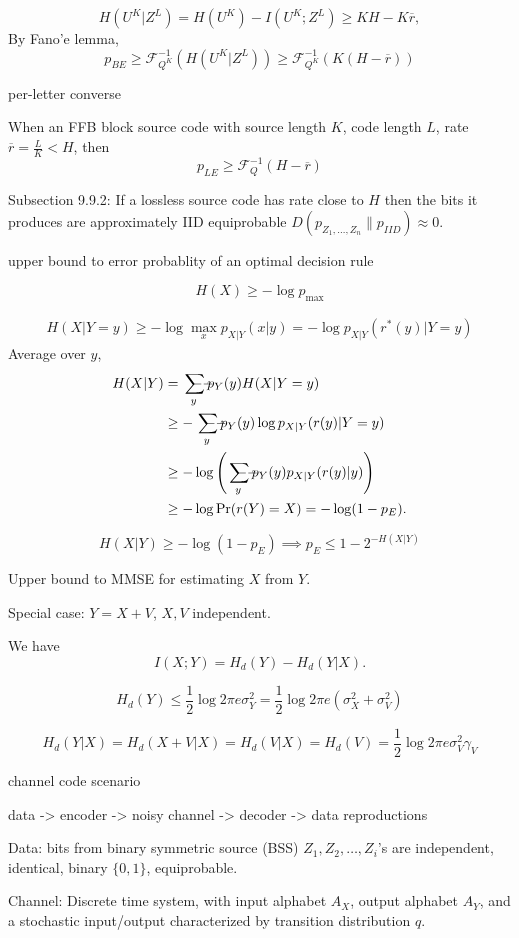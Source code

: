 \documentclass{report}
\def \ssumsym {\mathrlap{\ \ --}\sum}
\DeclareMathOperator*{\ssum}{\ssumsym}
\theoremstyle{definition}
\theoremstyle{remark}
\numberwithin{equation}{section}
\begin{document}
\[
H(U^K|Z^L) = H(U^K) - I(U^K;Z^L) \geq KH - K\overline{r},  
\] By Fano'e lemma, \[p_{BE} \geq \mathscr{F}_{Q^K}^{-1}\left(H(U^K|Z^L)\right) \geq \mathscr{F}_{Q^K}^{-1}(K(H - \overline{r}))\]

per-letter converse

When an FFB block source code with source length $K$, code length $L$, rate $\overline{r}=\frac{L}{K} < H$, then \[p_{LE} \geq \mathscr{F}_Q^{-1}(H - \overline{r})\]

Subsection 9.9.2: If a lossless source code has rate close to $H$ then the bits it produces are approximately IID equiprobable $D(p_{Z_1, \ldots, Z_n}\| p_{IID}) \approx 0$.


upper bound to error probablity of an optimal decision rule

\[H(X) \geq - \log p_{\max}\]

\begin{align*}
  H(X|Y=y) \geq - \log \max_{x} p_{X|Y}(x|y) = -\log p_{X|Y}(r^*(y)|Y = y)
\end{align*}
Average over $y$, \begin{align*}
  H(X|Y) & = \ssum_y p_Y(y) H(X|Y = y) \\
  & \geq - \ssum_y p_Y(y) \log p_{X|Y}(r(y)|Y = y) \\
  & \geq - \log \left(\ssum_y p_Y(y)p_{X|Y}(r(y)|y)\right) \\
  & \geq - \log \Pr(r(Y) = X) = - \log (1 - p_E).
\end{align*}

\[H(X|Y) \geq - \log(1 - p_E) \implies p_E \leq 1 - 2^{-H(X|Y)}\]

Upper bound to MMSE for estimating $X$ from $Y$.

Special case: $Y = X + V$, $X, V$ independent.

We have \[I(X; Y) = H_d(Y) - H_d(Y|X).\]

\[H_d(Y) \leq \frac{1}{2}\log2\pi e\sigma_Y^2=\frac{1}{2}\log2\pi e(\sigma_X^2 + \sigma_V^2)\]

\[
  H_d(Y|X) = H_d(X + V|X) = H_d(V|X) = H_d(V) = \frac{1}{2}\log 2\pi e \sigma_V^2\gamma_V
\]


channel code scenario

data -> encoder -> noisy channel -> decoder -> data reproductions

Data: bits from binary symmetric source (BSS)
$Z_1, Z_2, \ldots, Z_i$'s are independent, identical, binary $\{0, 1\}$, equiprobable. 

Channel: Discrete time system, with input alphabet $A_X$, output alphabet $A_Y$, and a stochastic input/output characterized by transition distribution $q$.
\end{document}
